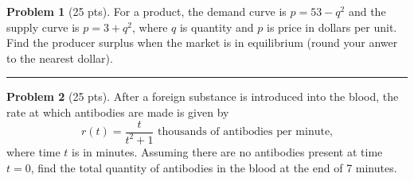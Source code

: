 \documentclass[12pt]{article}
\theoremstyle{definition}
\newtheorem{problem}{Problem}
\begin{document}
\bigskip
\begin{problem}[25 pts]
For a product, the demand curve is $p=53-q^2$ and the supply curve is $p=3+q^2$, where $q$ is quantity and $p$ is price in dollars per unit. Find the producer surplus when the market is in equilibrium (round your anwer to the nearest dollar).
\vspace{10cm}
\end{problem}
\hrule

\begin{problem}[25 pts]
After a foreign substance is introduced into the blood, the rate at which antibodies are made is given by
\begin{equation*}
r(t) = \frac{t}{t^2+1} \text{ thousands of antibodies per minute,}
\end{equation*}
where time $t$ is in minutes.  Assuming there are no antibodies present at time $t=0$, find the total quantity of antibodies in the blood at the end of 7 minutes.
\end{problem}
\end{document}

